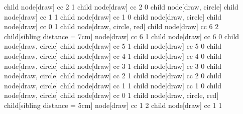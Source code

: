 {{{{{{{{{{{{                              child { node[draw] { \ntt cc 2 1 } 
                                child { node[draw] { \ntt cc 2 0 } 
                                  child { node[draw, circle] {  } }
                                }
                                child { node[draw] { \ntt cc 1 1 } 
                                  child { node[draw] { \ntt cc 1 0 } 
                                    child { node[draw, circle] {  } }
                                  }
                                  child { node[draw] { \ntt cc 0 1 } 
                                    child { node[draw, circle, red] {  } }
                                  }
                                }
                              }
                            }
                          }
                        }
                      }
                    }
                  }
                }
              }
            }
            child { node[draw] { \ntt cc 6 2 }
              child[sibling distance = 7cm] { node[draw] { \ntt cc 6 1 } 
                child { node[draw] { \ntt cc 6 0 } 
                  child { node[draw, circle] {  } }
                }
                child { node[draw] { \ntt cc 5 1 } 
                  child { node[draw] { \ntt cc 5 0 } 
                    child { node[draw, circle] {  } }
                  }
                  child { node[draw] { \ntt cc 4 1 } 
                    child { node[draw] { \ntt cc 4 0 } 
                      child { node[draw, circle] {  } }
                    }
                    child { node[draw] { \ntt cc 3 1 } 
                      child { node[draw] { \ntt cc 3 0 } 
                        child { node[draw, circle] {  } }
                      }
                      child { node[draw] { \ntt cc 2 1 } 
                        child { node[draw] { \ntt cc 2 0 } 
                          child { node[draw, circle] {  } }
                        }
                        child { node[draw] { \ntt cc 1 1 } 
                          child { node[draw] { \ntt cc 1 0 } 
                            child { node[draw, circle] {  } }
                          }
                          child { node[draw] { \ntt cc 0 1 } 
                            child { node[draw, circle, red] {  } }
                          }
                        }
                      }
                    }
                  }
                }
              }
              child[sibling distance = 5cm] { node[draw] { \ntt cc 1 2 } 
                child { node[draw] { \ntt cc 1 1 } 
}}}}}}
